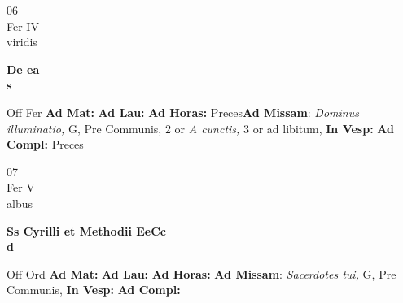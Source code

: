 \documentclass[10pt, openany]{book}
\begin{document}
        \begin{center}
            \begin{minipage}{3.5in}
                \vspace{2em}
                \begin{minipage}{0.5in}
                    {\Huge 06} \\
                    {\normalsize Fer IV} \\
                    {\normalsize viridis}
                \end{minipage}
                \begin{minipage}{3.0in}
                    \textbf{ \large De ea \\
                    \textnormal{\normalsize s}} \\ 
                \end{minipage}
                \begin{justify}Off Fer
                    \textbf{Ad Mat: }
                    \textbf{Ad Lau: }
                    \textbf{Ad Horas: }Preces\textbf{Ad Missam}: \textit{Dominus illuminatio,} G, Pre Communis, 2 or \textit{A cunctis,} 3 or ad libitum,  
                    \textbf{In Vesp: }
                    \textbf{Ad Compl: }Preces
                \end{justify}
            \end{minipage}
        \end{center}
    
        \begin{center}
            \begin{minipage}{3.5in}
                \vspace{2em}
                \begin{minipage}{0.5in}
                    {\Huge 07} \\
                    {\normalsize Fer V} \\
                    {\normalsize albus}
                \end{minipage}
                \begin{minipage}{3.0in}
                    \textbf{ \large Ss Cyrilli et Methodii EeCc \\
                    \textnormal{\normalsize d}} \\ 
                \end{minipage}
                \begin{justify}Off Ord
                    \textbf{Ad Mat: }
                    \textbf{Ad Lau: }
                    \textbf{Ad Horas: }\textbf{Ad Missam}: \textit{Sacerdotes tui,} G, Pre Communis,  
                    \textbf{In Vesp: }
                    \textbf{Ad Compl: }
                \end{justify}
            \end{minipage}
        \end{center}
    
\end{document}
